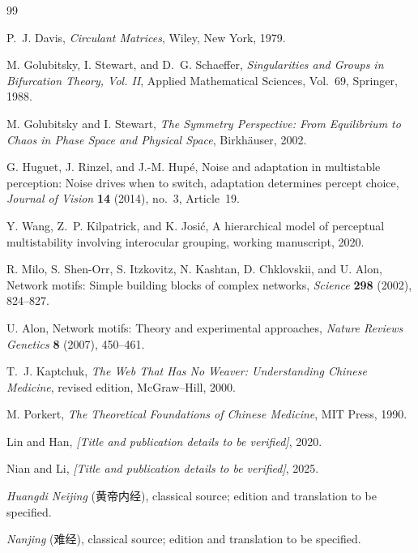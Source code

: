 \documentclass[11pt, reqno]{amsart}
\theoremstyle{definition}
\theoremstyle{remark}
\begin{document}
	
	\begin{thebibliography}{99}
		
		P.~J. Davis,
		\emph{Circulant Matrices},
		Wiley, New York, 1979.
		
		M. Golubitsky, I. Stewart, and D.~G. Schaeffer,
		\emph{Singularities and Groups in Bifurcation Theory, Vol. II},
		Applied Mathematical Sciences, Vol.~69, Springer, 1988.
		
		M. Golubitsky and I. Stewart,
		\emph{The Symmetry Perspective: From Equilibrium to Chaos in Phase Space and
			Physical Space},
		Birkh\"auser, 2002.
		
		G. Huguet, J. Rinzel, and J.-M. Hup\'e,
		Noise and adaptation in multistable perception: Noise drives when to switch,
		adaptation determines percept choice,
		\emph{Journal of Vision} \textbf{14} (2014), no.~3, Article~19.
		
		Y. Wang, Z.~P. Kilpatrick, and K. Josi\'c,
		A hierarchical model of perceptual multistability involving interocular
		grouping,
		working manuscript, 2020.
		
		R. Milo, S. Shen-Orr, S. Itzkovitz, N. Kashtan, D. Chklovskii, and U. Alon,
		Network motifs: Simple building blocks of complex networks,
		\emph{Science} \textbf{298} (2002), 824--827.
		
		U. Alon,
		Network motifs: Theory and experimental approaches,
		\emph{Nature Reviews Genetics} \textbf{8} (2007), 450--461.
		
		T.~J. Kaptchuk,
		\emph{The Web That Has No Weaver: Understanding Chinese Medicine},
		revised edition, McGraw--Hill, 2000.
		
		M. Porkert,
		\emph{The Theoretical Foundations of Chinese Medicine},
		MIT Press, 1990.
		
		Lin and Han,
		\emph{[Title and publication details to be verified]},
		2020.
		
		Nian and Li,
		\emph{[Title and publication details to be verified]},
		2025.
		
		\emph{Huangdi Neijing} (黄帝内经),
		classical source; edition and translation to be specified.
		
		\emph{Nanjing} (难经),
		classical source; edition and translation to be specified.
		
	\end{thebibliography}
	
\end{document}
